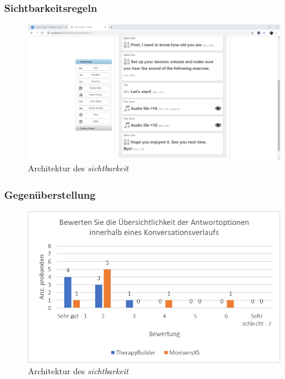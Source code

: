 \subsubsection{Sichtbarkeitsregeln}

\begin{figure}[h]
\centering
\includegraphics[width=1\textwidth]{pictures/sichtbarkeit}
\caption{Architektur des \emph{sichtbarkeit}}
\label{therapyBuilder}
\end{figure}


\subsubsection{Gegenüberstellung}

\begin{figure}[h]
\centering
\includegraphics[width=1\textwidth]{pictures/diagramme/antwortoptkonv}
\caption{Architektur des \emph{sichtbarkeit}}
\label{therapyBuilder}
\end{figure}

